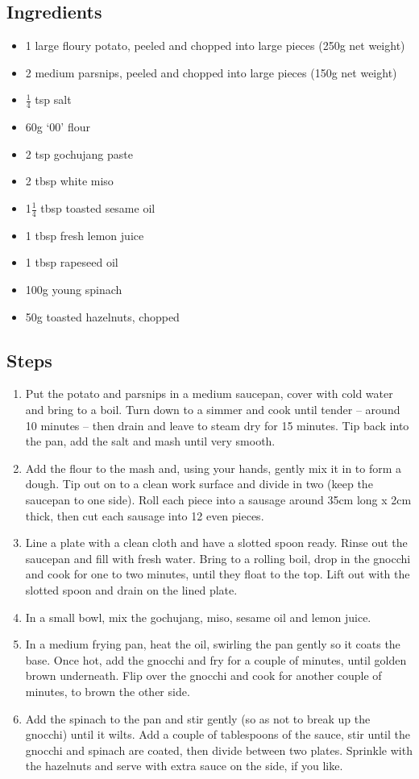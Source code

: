 \documentclass{book}
\begin{document}
\subsection*{Ingredients}
\begin{itemize}
\item 1 large floury potato, peeled and chopped into large pieces (250g net weight)
\item 2 medium parsnips, peeled and chopped into large pieces (150g net weight)
\item $\frac{1}{4}$ tsp salt
\item 60g ‘00’ flour
\item 2 tsp gochujang paste
\item 2 tbsp white miso
\item 1$\frac{1}{4}$ tbsp toasted sesame oil
\item 1 tbsp fresh lemon juice
\item 1 tbsp rapeseed oil
\item 100g young spinach
\item 50g toasted hazelnuts, chopped
\end{itemize}

\subsection*{Steps}
\begin{enumerate}
\item Put the potato and parsnips in a medium saucepan, cover with cold water and bring to a boil. Turn down to a simmer and cook until tender – around 10 minutes – then drain and leave to steam dry for 15 minutes. Tip back into the pan, add the salt and mash until very smooth.
\item Add the flour to the mash and, using your hands, gently mix it in to form a dough. Tip out on to a clean work surface and divide in two (keep the saucepan to one side). Roll each piece into a sausage around 35cm long x 2cm thick, then cut each sausage into 12 even pieces.
\item Line a plate with a clean cloth and have a slotted spoon ready. Rinse out the saucepan and fill with fresh water. Bring to a rolling boil, drop in the gnocchi and cook for one to two minutes, until they float to the top. Lift out with the slotted spoon and drain on the lined plate.
\item In a small bowl, mix the gochujang, miso, sesame oil and lemon juice.
\item In a medium frying pan, heat the oil, swirling the pan gently so it coats the base. Once hot, add the gnocchi and fry for a couple of minutes, until golden brown underneath. Flip over the gnocchi and cook for another couple of minutes, to brown the other side.
\item Add the spinach to the pan and stir gently (so as not to break up the gnocchi) until it wilts. Add a couple of tablespoons of the sauce, stir until the gnocchi and spinach are coated, then divide between two plates. Sprinkle with the hazelnuts and serve with extra sauce on the side, if you like.
\end{enumerate}
\newpage
\end{document}
